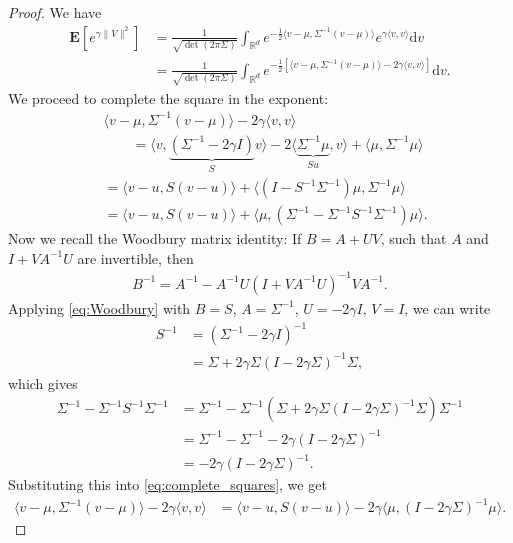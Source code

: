 \documentclass[final,12pt]{colt2018}
\numberwithin{equation}{section}
\numberwithin{equation}{section}
\def\E{\mathbf{E}}
\def\Reals{\mathbb{R}}
\def\d{{\mathrm d}}
\def\ave#1{\langle #1 \rangle}
\begin{document}
    \begin{proof} We have
    	\begin{align}
    		\E[e^{{\gamma}\|V\|^2}] &= \frac{1}{\sqrt{\det(2\pi \Sigma)}}\int_{\Reals^d} e^{-\frac{1}{2}\ave{v-\mu,\Sigma^{-1}(v-\mu)}}e^{{\gamma} \ave{v,v}} \d v \nonumber\\
    		&= \frac{1}{\sqrt{\det(2\pi \Sigma)}} \int_{\Reals^d}e^{-\frac{1}{2}[\ave{v-\mu,\Sigma^{-1}(v-\mu)}-2{\gamma}\ave{v,v}]}\d v.\label{eq:Gauss_integral}
    	\end{align}
We proceed to complete the square in the exponent:
    	\begin{align}
   	&	\ave{v-\mu,\Sigma^{-1}(v-\mu)}-2{\gamma}\ave{v,v}  \nonumber\\
    	& \qquad = \ave{v,\underbrace{(\Sigma^{-1}-2{\gamma}I)}_{S}v} - 2\ave{\underbrace{\Sigma^{-1}\mu}_{Su}, v} + \ave{\mu,\Sigma^{-1}\mu} \nonumber \\
    	&= \ave{v-u,S(v-u)}+ \ave{(I-S^{-1}\Sigma^{-1})\mu,\Sigma^{-1}\mu} \nonumber \\
    	&= \ave{v-u,S(v-u)} + \ave{\mu,(\Sigma^{-1}-\Sigma^{-1}S^{-1}\Sigma^{-1})\mu}.\label{eq:complete_squares}
    	\end{align}
Now we recall the Woodbury matrix identity: If $B = A + UV$, such that $A$ and $I + VA^{-1}U$ are invertible, then
    \begin{align}\label{eq:Woodbury}
    	B^{-1} = A^{-1} - A^{-1}U(I + VA^{-1}U)^{-1}VA^{-1}.
    \end{align}
Applying \eqref{eq:Woodbury} with $B = S$, $A = \Sigma^{-1}$, $U = -2{\gamma}I$, $V = I$, we can write
    \begin{align*}
    	S^{-1} &= (\Sigma^{-1}-2{\gamma}I)^{-1} \\
    	&= \Sigma + 2{\gamma}\Sigma(I - 2{\gamma}\Sigma)^{-1}\Sigma,
    \end{align*}
    which gives
    \begin{align*}
    	\Sigma^{-1}-\Sigma^{-1}S^{-1}\Sigma^{-1} &= \Sigma^{-1} - \Sigma^{-1} \left(\Sigma + 2{\gamma}\Sigma(I - 2{\gamma}\Sigma)^{-1}\Sigma \right)\Sigma^{-1} \\
    	&= \Sigma^{-1} - \Sigma^{-1} - 2{\gamma}(I-2{\gamma}\Sigma)^{-1} \\
    	&= - 2{\gamma}(I-2{\gamma}\Sigma)^{-1} .
    \end{align*}
    Substituting this into \eqref{eq:complete_squares}, we get
    \begin{align*}
    	\ave{v-\mu,\Sigma^{-1}(v-\mu)}-2{\gamma}\ave{v,v} &= \ave{v-u,S(v-u)} - 2{\gamma}\ave{\mu,(I-2{\gamma}\Sigma)^{-1}\mu}.

\end{align*}
\end{proof}
\end{document}
